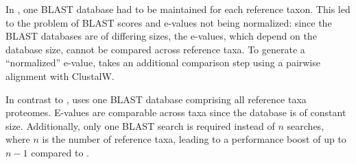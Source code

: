 In \hamstr, one BLAST database had to be maintained for each reference taxon.
This led to the problem of BLAST scores and e-values not being normalized: since
the \hamstr BLAST databases are of differing sizes, the e-values, which depend
on the database size, cannot be compared across reference taxa. To generate a
``normalized'' e-value, \hamstr takes an additional comparison step using a
pairwise alignment with ClustalW.

In contrast to \hamstr, \pname uses one BLAST database comprising all reference
taxa proteomes. E-values are comparable across taxa since the database is of
constant size. Additionally, only one BLAST search is required instead of $n$
searches, where $n$ is the number of reference taxa, leading to a performance
boost of up to $n-1$ compared to \hamstr.
